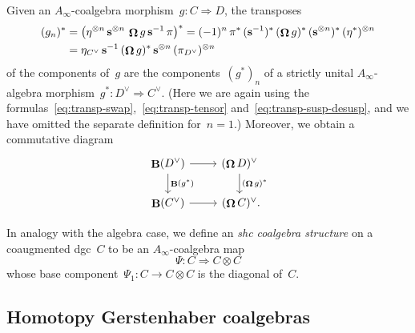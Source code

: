 \documentclass[letterpaper]{amsart}
\numberwithin{equation}{section}
\theoremstyle{plain}
\theoremstyle{definition}
\theoremstyle{remark}
\let\newterm\emph
\def\Ainf{A_{\infty}}
\DeclareMathOperator{\BB}{\mathbf{B}}
\def\susp{\mathbf{s}}
\def\desusp{\susp^{-1}}
\DeclareMathOperator{\Cobar}{\mathbf{\Omega}}
\begin{document}
Given an $\Ainf$-coalgebra morphism~$g\colon C\Rightarrow D$, the transposes
\begin{align}
  (g_{n})^{*} &= \bigl(\eta^{\otimes n}\,\susp^{\otimes n}\,\Cobar g\,\desusp\,\pi\bigr)^{*}
  = (-1)^{n}\,\pi^{*}\,(\desusp)^{*}\,(\Cobar g)^{*}\,(\susp^{\otimes n})^{*}\,(\eta^{*})^{\otimes n} \\
  \notag &= \eta_{C^{\vee}}\,\desusp\,(\Cobar g)^{*}\,\susp^{\otimes n}\,(\pi_{D^{\vee}})^{\otimes n}
\end{align}
of the components of~$g$
are the components~$(g^{*})_{n}$ of a strictly unital $\Ainf$-algebra morphism~$g^{*}\colon D^{\vee}\Rightarrow C^{\vee}$.
(Here we are again using the formulas~\eqref{eq:transp-swap},~\eqref{eq:transp-tensor} and~\eqref{eq:transp-susp-desusp},
and we have omitted the separate definition for~$n=1$.)
Moreover, we obtain a commutative diagram
\begin{equation}
  \begin{tikzcd}
    \BB(D^{\vee}) \arrow{d}{\BB(g^{*})} \arrow{r} & (\Cobar D)^{\vee} \arrow{d}{(\Cobar g)^{*}} \\
    \BB(C^{\vee}) \arrow{r} & (\Cobar C)^{\vee}\mathrlap{.}
  \end{tikzcd}
\end{equation}

In analogy with the algebra case,
we define an \newterm{shc coalgebra structure} on a coaugmented dgc~$C$ to be an $\Ainf$-coalgebra map
\begin{equation}
  \Psi\colon C \Rightarrow C\otimes C
\end{equation}
whose base component~$\Psi_{1}\colon C\to C\otimes C$ is the diagonal of~$C$.


\subsection{Homotopy Gerstenhaber coalgebras}
\end{document}
